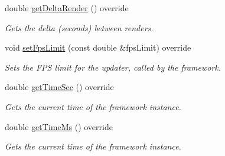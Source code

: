 \begin{DoxyCompactItemize}
double \hyperlink{classflounder_1_1glfwupdater_a3f8d8a108c8db0d2ead35088646687c9}{get\+Delta\+Render} () override
\begin{DoxyCompactList}\small\item\em Gets the delta (seconds) between renders. \end{DoxyCompactList}\item 
void \hyperlink{classflounder_1_1glfwupdater_a8beaa82a7604b9ae11baf3f822e86113}{set\+Fps\+Limit} (const double \&fps\+Limit) override
\begin{DoxyCompactList}\small\item\em Sets the F\+PS limit for the updater, called by the framework. \end{DoxyCompactList}\item 
double \hyperlink{classflounder_1_1glfwupdater_a6982b83970693347bfa460adc04cf984}{get\+Time\+Sec} () override
\begin{DoxyCompactList}\small\item\em Gets the current time of the framework instance. \end{DoxyCompactList}\item 
double \hyperlink{classflounder_1_1glfwupdater_a1c3b884efb6e785143db556d4db9bdc8}{get\+Time\+Ms} () override
\begin{DoxyCompactList}\small\item\em Gets the current time of the framework instance. \end{DoxyCompactList}\end{DoxyCompactItemize}
